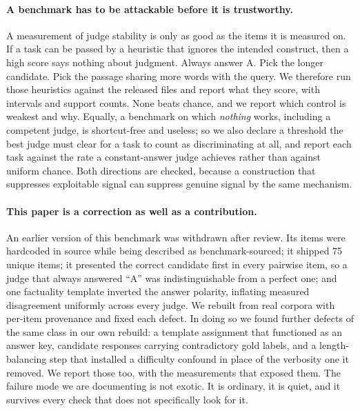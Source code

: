 \documentclass[11pt]{article}          %
\newif\ifblind
\begin{document}
\paragraph{A benchmark has to be attackable before it is trustworthy.}
A measurement of judge stability is only as good as the items it is measured on.
If a task can be passed by a heuristic that ignores the intended construct, then
a high score says nothing about judgment. Always answer A. Pick the longer
candidate. Pick the passage sharing more words with the query. We therefore
run those heuristics against the released files and report what they score, with
intervals and support counts. None beats chance, and we report which control is
weakest and why. Equally, a benchmark on which \emph{nothing} works,
including a competent judge, is shortcut-free and useless; so we also declare a
threshold the best judge must clear for a task to count as discriminating at
all, and report each task against the rate a constant-answer judge achieves
rather than against uniform chance. Both directions are checked, because a construction that
suppresses exploitable signal can suppress genuine signal by the same mechanism.

\paragraph{This paper is a correction as well as a contribution.}
An earlier version of this benchmark
\ifblind(reference withheld for review)\else\citep{bellibatlu2026judgesense}\fi{} was
withdrawn after review. Its items were
hardcoded in source while being described as benchmark-sourced; it shipped 75
unique items; it presented the correct candidate first in every pairwise item, so
a judge that always answered ``A'' was indistinguishable from a perfect one; and
one factuality template inverted the answer polarity, inflating measured
disagreement uniformly across every judge. We rebuilt from real corpora with
per-item provenance and fixed each defect. In doing so we found further defects of the same class in our own rebuild: a
template assignment that functioned as an answer key, candidate responses
carrying contradictory gold labels, and a length-balancing step that installed a
difficulty confound in place of the verbosity one it removed. We report those
too, with the measurements that exposed them. The failure mode we are documenting is not exotic. It is
ordinary, it is quiet, and it survives every check that does not specifically
look for it.
\end{document}
